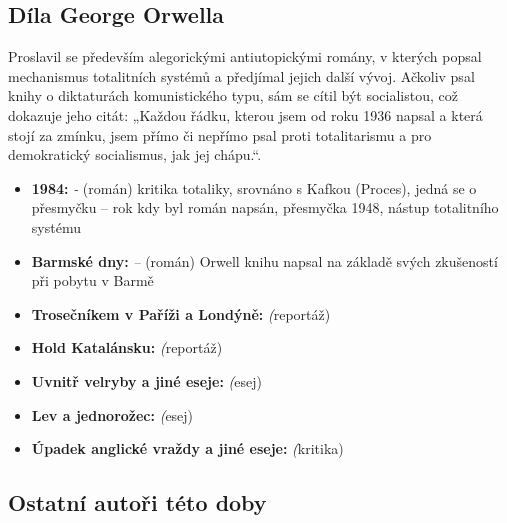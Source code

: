 \documentclass{article}
\newcommand{\point}[2]{\noindent \textbf{#1:} \textit{#2}}
\begin{document}
\subsection{Díla George Orwella}
Proslavil se především alegorickými antiutopickými romány, v kterých popsal mechanismus totalitních systémů a 
předjímal jejich další vývoj. Ačkoliv psal knihy o diktaturách komunistického typu, sám se cítil být 
socialistou, což dokazuje jeho citát: „Každou řádku, kterou jsem od roku 1936 napsal a která stojí za zmínku, 
jsem přímo či nepřímo psal proti totalitarismu a pro demokratický socialismus, jak jej chápu.“. 

\begin{itemize}
    \item \point{1984} - (román) kritika totaliky, srovnáno s Kafkou (Proces), jedná se o přesmyčku – rok kdy 
    byl román napsán, přesmyčka 1948, nástup totalitního systému
    
    \item \point{Barmské dny} – (román) Orwell knihu napsal na základě svých zkušeností při pobytu v Barmě
    \item \point{Trosečníkem v Paříži a Londýně} (reportáž)
    \item \point{Hold Katalánsku} (reportáž)
    \item \point{Uvnitř velryby a jiné eseje} (esej)
	\item \point{Lev a jednorožec} (esej)
	\item \point{Úpadek anglické vraždy a jiné eseje} (kritika)

\end{itemize}

\subsection{Ostatní autoři této doby}
\end{document}
